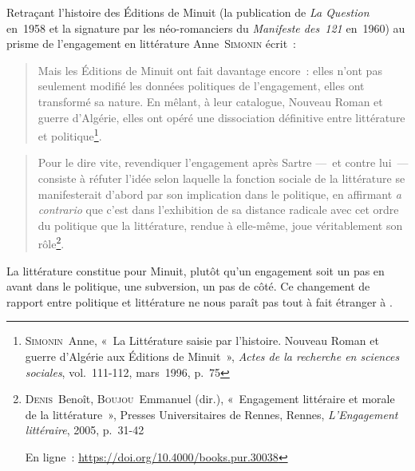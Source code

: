 \documentclass[12pt, a4paper]{article}
\begin{document}
 Retraçant l'histoire des Éditions de Minuit (la publication de \textit{La Question} en~1958 et la signature par les néo-romanciers du \textit{Manifeste des~121} en~1960) au prisme de l'engagement en littérature Anne~\textsc{Simonin} écrit~:
\begin{quote}
    Mais les Éditions de Minuit ont fait davantage encore~: elles n'ont pas seulement modifié les données politiques de l'engagement, elles ont transformé sa nature. En mêlant, à leur catalogue, Nouveau Roman et guerre d'Algérie, elles ont opéré une dissociation définitive entre littérature et politique\footnote{\textsc{Simonin}~Anne, «~La Littérature saisie par l'histoire. Nouveau Roman et guerre d'Algérie aux Éditions de Minuit~»,  \textit{Actes de la recherche en sciences sociales}, vol.~111-112, mars~1996, p.~75}. 
\end{quote}

\begin{quote}
    Pour le dire vite, revendiquer l’engagement après Sartre —~et contre lui~— consiste à réfuter l’idée selon laquelle la fonction sociale de la littérature se manifesterait d’abord par son implication dans le politique, en affirmant \textit{a contrario} que c’est dans l’exhibition de sa distance radicale avec cet ordre du politique que la littérature, rendue à elle-même, joue véritablement son rôle\footnote{\textsc{Denis}~Benoît, \textsc{Boujou}~Emmanuel (dir.), «~Engagement littéraire et morale de la littérature~», Presses Universitaires de Rennes, Rennes, \textit{L'Engagement littéraire}, 2005, p.~31-42
			
			En ligne~: \hyperlink{https://doi.org/10.4000/books.pur.30038}{https://doi.org/10.4000/books.pur.30038}}.
\end{quote}

La littérature constitue pour Minuit, plutôt qu'un engagement soit un pas en avant dans le politique, une subversion, un pas de côté. Ce changement de rapport entre politique et littérature ne nous paraît pas tout à fait étranger à \punr.
\end{document}
